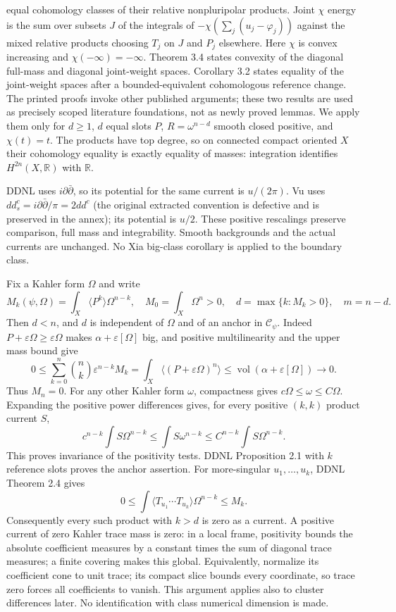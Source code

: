 \documentclass[
  11pt,
]{article}
\begin{document}
\begin{itemize}
  equal cohomology classes of their relative nonpluripolar products.
  Joint \(\chi\) energy is the sum over subsets \(J\) of the integrals
  of \(-\chi(\sum_j(u_j-\varphi_j))\) against the mixed relative
  products choosing \(T_j\) on \(J\) and \(P_j\) elsewhere. Here
  \(\chi\) is convex increasing and \(\chi(-\infty)=-\infty\). Theorem
  3.4 states convexity of the diagonal full-mass and diagonal
  joint-weight spaces. Corollary 3.2 states equality of the joint-weight
  spaces after a bounded-equivalent cohomologous reference change. The
  printed proofs invoke other published arguments; these two results are
  used as precisely scoped literature foundations, not as newly proved
  lemmas. We apply them only for \(d\geq1\), \(d\) equal slots \(P\),
  \(R=\omega^{n-d}\) smooth closed positive, and \(\chi(t)=t\). The
  products have top degree, so on connected compact oriented \(X\) their
  cohomology equality is exactly equality of masses: integration
  identifies \(H^{2n}(X,\mathbb R)\) with \(\mathbb R\).
\end{itemize}

DDNL uses \(i\partial\bar\partial\), so its potential for the same
current is \(u/(2\pi)\). Vu uses
\(dd^c_s=i\partial\bar\partial/\pi=2dd^c\) (the original extracted
convention is defective and is preserved in the annex); its potential is
\(u/2\). These positive rescalings preserve comparison, full mass and
integrability. Smooth backgrounds and the actual currents are unchanged.
No Xia big-class corollary is applied to the boundary class.

Fix a Kahler form \(\Omega\) and write \[
M_k(\psi,\Omega)=\int_X\langle P^k\rangle\Omega^{n-k},\quad M_0=\int_X\Omega^n>0,
\quad d=\max\{k:M_k>0\},\quad m=n-d.
\] Then \(d<n\), and \(d\) is independent of \(\Omega\) and of an anchor
in \(\mathcal C_\psi\). Indeed
\(P+\varepsilon\Omega\geq\varepsilon\Omega\) makes
\(\alpha+\varepsilon[\Omega]\) big, and positive multilinearity and the
upper mass bound give \[
0\leq\sum_{k=0}^n\binom nk\varepsilon^{n-k}M_k
=\int_X\langle(P+\varepsilon\Omega)^n\rangle
\leq\operatorname{vol}(\alpha+\varepsilon[\Omega])\longrightarrow0.
\] Thus \(M_n=0\). For any other Kahler form \(\omega\), compactness
gives \(c\Omega\leq\omega\leq C\Omega\). Expanding the positive power
differences gives, for every positive \((k,k)\) product current \(S\),
\[
c^{n-k}\int S\Omega^{n-k}\leq\int S\omega^{n-k}\leq C^{n-k}\int S\Omega^{n-k}.
\] This proves invariance of the positivity tests. DDNL Proposition 2.1
with \(k\) reference slots proves the anchor assertion. For
more-singular \(u_1,\ldots,u_k\), DDNL Theorem 2.4 gives \[
0\leq\int\langle T_{u_1}\cdots T_{u_k}\rangle\Omega^{n-k}\leq M_k.
\] Consequently every such product with \(k>d\) is zero as a current. A
positive current of zero Kahler trace mass is zero: in a local frame,
positivity bounds the absolute coefficient measures by a constant times
the sum of diagonal trace measures; a finite covering makes this global.
Equivalently, normalize its coefficient cone to unit trace; its compact
slice bounds every coordinate, so trace zero forces all coefficients to
vanish. This argument applies also to cluster differences later. No
identification with class numerical dimension is made.
\end{document}
